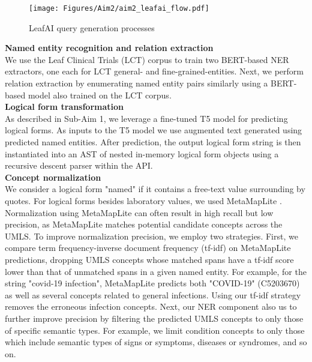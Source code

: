 \documentclass[../main.tex]{subfiles}
\begin{document}
\begin{figure}[h]
  \texttt{[image: Figures/Aim2/aim2\_leafai\_flow.pdf]}  
\caption{LeafAI query generation processes}
\label{aim2_fig_leafai_querygen}
\end{figure}

\noindent \textbf{Named entity recognition and relation extraction} \\
We use the Leaf Clinical Trials (LCT) corpus \cite{dobbins2022leaf} to train two BERT-based \cite{devlin2018bert} NER extractors, one each for LCT general- and fine-grained-entities. Next, we perform relation extraction by enumerating named entity pairs similarly using a BERT-based model also trained on the LCT corpus. \\

\noindent \textbf{Logical form transformation} \\
As described in Sub-Aim 1, we leverage a fine-tuned T5 model for predicting logical forms. As inputs to the T5 model we use augmented text generated using predicted named entities. After prediction, the output logical form string is then instantiated into an AST of nested in-memory logical form objects using a recursive descent parser within the API. \\

\noindent \textbf{Concept normalization} \\
We consider a logical form "named" if it contains a free-text value surrounding by quotes. For logical forms besides laboratory values, we used MetaMapLite \cite{aronson2001effective, demner2017metamap}. Normalization using MetaMapLite can often result in high recall but low precision, as MetaMapLite matches potential candidate concepts across the UMLS. To improve normalization precision, we employ two strategies. First, we compare term frequency-inverse document frequency (tf-idf) on MetaMapLite predictions, dropping UMLS concepts whose matched spans have a tf-idf score lower than that of unmatched spans in a given named entity. For example, for the string "covid-19 infection", MetaMapLite predicts both "COVID-19" (C5203670) as well as several concepts related to general infections. Using our tf-idf strategy removes the erroneous infection concepts. Next, our NER component also us to further improve precision by filtering the predicted UMLS concepts to only those of specific semantic types. For example, we limit condition concepts to only those which include semantic types of signs or symptoms, diseases or syndromes, and so on. 
\end{document}
